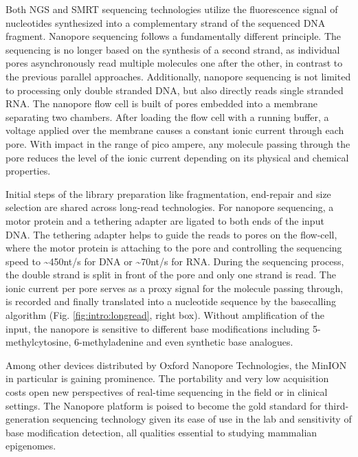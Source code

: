 Both NGS and SMRT sequencing technologies utilize the fluorescence signal of nucleotides synthesized into a complementary strand of the sequenced DNA fragment.
Nanopore sequencing follows a fundamentally different principle.
The sequencing is no longer based on the synthesis of a second strand, as individual pores asynchronously read multiple molecules one after the other, in contrast to the previous parallel approaches.
Additionally, nanopore sequencing is not limited to processing only double stranded DNA, but also directly reads single stranded RNA.
The nanopore flow cell is built of pores embedded into a membrane separating two chambers.
After loading the flow cell with a running buffer, a voltage applied over the membrane causes a constant ionic current through each pore.
With impact in the range of pico ampere, any molecule passing through the pore reduces the level of the ionic current depending on its physical and chemical properties.

Initial steps of the library preparation like fragmentation, end-repair and size selection are shared across long-read technologies.
For nanopore sequencing, a motor protein and a tethering adapter are ligated to both ends of the input DNA.
The tethering adapter helps to guide the reads to pores on the flow-cell, where the motor protein is attaching to the pore and controlling the sequencing speed to \textasciitilde450nt/s for DNA or \textasciitilde70nt/s for RNA.
During the sequencing process, the double strand is split in front of the pore and only one strand is read.
The ionic current per pore serves as a proxy signal for the molecule passing through, is recorded and finally translated into a nucleotide sequence by the basecalling algorithm (Fig. \ref{fig:intro:longread}, right box).
Without amplification of the input, the nanopore is sensitive to different base modifications including 5-methylcytosine, 6-methyladenine and even synthetic base analogues.

Among other devices distributed by Oxford Nanopore Technologies, the MinION in particular is gaining prominence. 
The portability and very low acquisition costs open new perspectives of real-time sequencing in the field or in clinical settings.
The Nanopore platform is poised to become the gold standard for third-generation sequencing technology given its ease of use in the lab and sensitivity of base modification detection, all qualities essential to studying mammalian epigenomes. 



